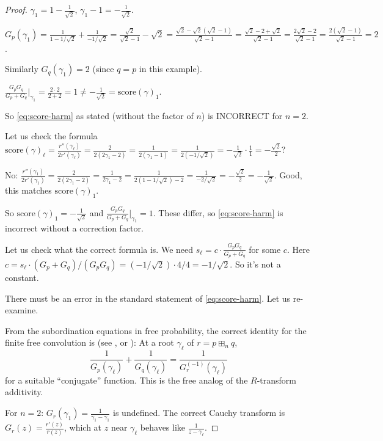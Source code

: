 \documentclass[12pt]{article}
\theoremstyle{definition}
\newcommand{\score}{\mathrm{score}}
\begin{document}
\begin{proof}
$\gamma_1=1-\frac{1}{\sqrt{2}}$, $\gamma_1-1=-\frac{1}{\sqrt 2}$.

$G_p(\gamma_1)=\frac{1}{1-1/\sqrt 2}+\frac{1}{-1/\sqrt 2}=\frac{\sqrt 2}{\sqrt 2-1}-\sqrt 2=\frac{\sqrt 2-\sqrt 2(\sqrt 2-1)}{\sqrt 2-1}=\frac{\sqrt 2-2+\sqrt 2}{\sqrt 2-1}=\frac{2\sqrt 2-2}{\sqrt 2-1}=\frac{2(\sqrt 2-1)}{\sqrt 2-1}=2$.

Similarly $G_q(\gamma_1)=2$ (since $q=p$ in this example).

$\frac{G_p G_q}{G_p+G_q}\bigg|_{\gamma_1}=\frac{2\cdot 2}{2+2}=1\neq -\frac{1}{\sqrt 2}=\score(\gamma)_1$.

So \eqref{eq:score-harm} as stated (without the factor of $n$) is INCORRECT for $n=2$.

Let us check the formula $\score(\gamma)_\ell = \frac{r''(\gamma_\ell)}{2r'(\gamma_\ell)} = \frac{2}{2(2\gamma_1-2)}=\frac{1}{2(\gamma_1-1)}=\frac{1}{2(-1/\sqrt 2)}=-\frac{1}{\sqrt 2}\cdot\frac{1}{1}=-\frac{\sqrt 2}{2}$?

No: $\frac{r''(\gamma_1)}{2r'(\gamma_1)}=\frac{2}{2(2\gamma_1-2)}=\frac{1}{2\gamma_1-2}=\frac{1}{2(1-1/\sqrt 2)-2}=\frac{1}{-2/\sqrt 2}=-\frac{\sqrt 2}{2}=-\frac{1}{\sqrt 2}$. Good, this matches $\score(\gamma)_1$.

So $\score(\gamma)_1=-\frac{1}{\sqrt 2}$ and $\frac{G_p G_q}{G_p+G_q}|_{\gamma_1}=1$. These differ, so \eqref{eq:score-harm} is incorrect without a correction factor.

Let us check what the correct formula is. We need $s_\ell=c\cdot\frac{G_p G_q}{G_p+G_q}$ for some $c$. Here $c = s_\ell\cdot(G_p+G_q)/(G_p G_q) = (-1/\sqrt 2)\cdot 4/4=-1/\sqrt 2$. So it's not a constant.

There must be an error in the standard statement of \eqref{eq:score-harm}. Let us re-examine.

From the subordination equations in free probability, the correct identity for the finite free convolution is (see \cite{Marcus21}, or \cite{AP18}):
At a root $\gamma_\ell$ of $r=p\boxplus_n q$,
\begin{equation}\label{eq:subord-correct}
  \frac{1}{G_p(\gamma_\ell)} + \frac{1}{G_q(\gamma_\ell)} = \frac{1}{G_r^{(-1)}(\gamma_\ell)}
\end{equation}
for a suitable ``conjugate'' function. This is the free analog of the $R$-transform additivity.

For $n=2$: $G_r(\gamma_1)=\frac{1}{\gamma_1-\gamma_1}$ is undefined. The correct Cauchy transform is $G_r(z)=\frac{r'(z)}{r(z)}$, which at $z$ near $\gamma_\ell$ behaves like $\frac{1}{z-\gamma_\ell}$.


\end{proof}
\end{document}
